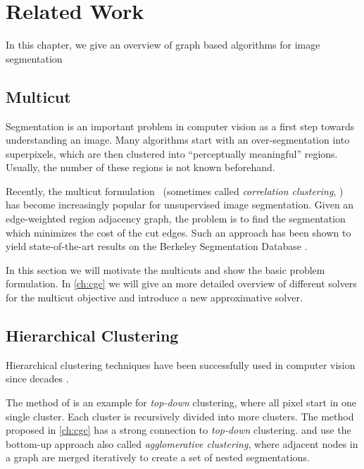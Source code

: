 \chapter{Related Work} \label{ch:reated_work}

In this chapter, we give an overview of graph based algorithms
for image segmentation 

\section{Multicut}\label{sec:rw_multicut}

Segmentation is an important problem in computer vision as a first step
towards understanding an image. Many algorithms start with an over-segmentation
into superpixels, which are then clustered into ``perceptually meaningful''
regions.
Usually, the number of these regions is not known beforehand.

Recently, the multicut formulation~\cite{chopra_1993_mp}
(sometimes called \emph{correlation clustering}, \cite{bansal_2004_ml})
has become increasingly popular for unsupervised
image segmentation.
Given an edge-weighted region adjacency graph,
the problem is to find the segmentation which
minimizes the cost of the cut edges.
Such an approach has been shown to yield
state-of-the-art results on the Berkeley Segmentation Database
\cite{andres_2011_iccv,yarkony_2012_eccv,alush_2013_simbad}.


In this section we will motivate the multicuts and show the basic problem formulation.
In \cref{ch:cgc} we will give an more detailed overview of different solvers
for the multicut objective and introduce a new approximative solver. 


\section{Hierarchical Clustering}\label{sec:rw_hc}

Hierarchical clustering techniques have been successfully used
in computer vision since decades \citep{ohlander_1978_cgip,forsyth_2002_book,arbelaez_2006_cvpr,iglesias_2013,morel_1995_book}.

The method  of \citet{ohlander_1978_cgip} is an example for \emph{top-down} clustering,
where all pixel start in one single cluster. Each cluster is recursively divided 
into  more clusters. The method proposed in \cref{ch:cgc} has a strong connection to
\emph{top-down} clustering.
\citet{arbelaez_2006_cvpr} and \citet{iglesias_2013} use the bottom-up approach 
also called \emph{agglomerative clustering}, where 
adjacent nodes in a graph are merged iteratively to create 
a set of nested segmentations.


